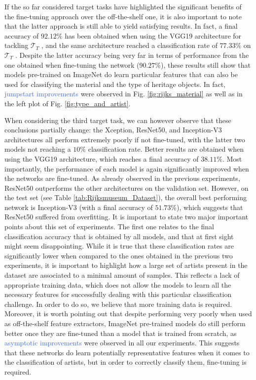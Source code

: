 If the so far considered target tasks have highlighted the significant benefits of the fine-tuning approach over the off-the-shelf one, it is also important to note that the latter approach is still able to yield satisfying results. In fact, a final accuracy of $92.12\%$ has been obtained when using the VGG19 architecture for tackling $\mathcal{T}_T$ , and the same architecture reached a classification rate of $77.33\%$ on $\mathcal{T}_T$ . Despite the latter accuracy being very far in terms of performance from the one obtained when fine-tuning the network ($90.27\%$), these results still show that models pre-trained on ImageNet do learn particular features that can also be used for classifying the material and the type of heritage objects. In fact, \textcolor{RoyalBlue}{jumpstart improvements} were observed in Fig. \ref{fig:rijks_material} as well as in the left plot of Fig. \ref{fig:type_and_artist}. 




When considering the third target task, we can however observe that these conclusions partially change: the Xception, ResNet50, and Inception-V3 architectures all perform extremely poorly if not fine-tuned, with the latter two models not reaching a $10\%$ classification rate. Better results are obtained when using the VGG19 architecture, which reaches a final accuracy of $38.11\%$. Most importantly, the performance of each model is again significantly improved when the networks are fine-tuned. As already observed in the previous experiments, ResNet50 outperforms the other architectures on the validation set. However, on the test set (see Table \ref{tab:Rijksmuseum_Dataset}), the overall best performing network is Inception-V3 (with a final accuracy of $51.73\%$), which suggests that ResNet50 suffered from overfitting. It is important to state two major important points about this set of experiments. The first one relates to the final classification accuracy that is obtained by all models, and that at first sight might seem disappointing. While it is true that these classification rates are significantly lower when compared to the ones obtained in the previous two experiments, it is important to highlight how a large set of artists present in the dataset are associated to a minimal amount of samples. This reflects a lack of appropriate training data, which does not allow the models to learn all the necessary features for successfully dealing with this particular classification challenge. In order to do so, we believe that more training data is required. Moreover, it is worth pointing out that despite performing very poorly when used as off-the-shelf feature extractors, ImageNet pre-trained models do still perform better once they are fine-tuned than a model that is trained from scratch, as \textcolor{RoyalBlue}{asymptotic improvements} were observed in all our experiments. This suggests that these networks do learn potentially representative features when it comes to the classification of artists, but in order to correctly classify them, fine-tuning is required.


